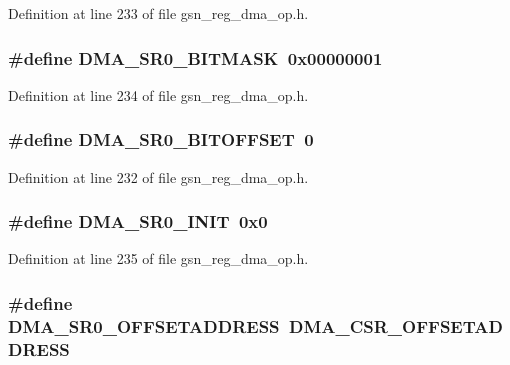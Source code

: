 Definition at line 233 of file gsn\_\-reg\_\-dma\_\-op.h.

\hypertarget{a00547_af658b00712f16d1fa959c76271802034}{
\subsubsection[{DMA\_\-SR0\_\-BITMASK}]{\setlength{\rightskip}{0pt plus 5cm}\#define DMA\_\-SR0\_\-BITMASK~0x00000001}}
\label{a00547_af658b00712f16d1fa959c76271802034}


Definition at line 234 of file gsn\_\-reg\_\-dma\_\-op.h.

\hypertarget{a00547_acf94b64a824bad73e99bc994cc10f5b3}{
\subsubsection[{DMA\_\-SR0\_\-BITOFFSET}]{\setlength{\rightskip}{0pt plus 5cm}\#define DMA\_\-SR0\_\-BITOFFSET~0}}
\label{a00547_acf94b64a824bad73e99bc994cc10f5b3}


Definition at line 232 of file gsn\_\-reg\_\-dma\_\-op.h.

\hypertarget{a00547_a3926fc1ed04ea79e16d3b15b0471fdb3}{
\subsubsection[{DMA\_\-SR0\_\-INIT}]{\setlength{\rightskip}{0pt plus 5cm}\#define DMA\_\-SR0\_\-INIT~0x0}}
\label{a00547_a3926fc1ed04ea79e16d3b15b0471fdb3}


Definition at line 235 of file gsn\_\-reg\_\-dma\_\-op.h.

\hypertarget{a00547_a12acfae055f8d089c0dbe4d97c0b7204}{
\subsubsection[{DMA\_\-SR0\_\-OFFSETADDRESS}]{\setlength{\rightskip}{0pt plus 5cm}\#define DMA\_\-SR0\_\-OFFSETADDRESS~DMA\_\-CSR\_\-OFFSETADDRESS}}
\label{a00547_a12acfae055f8d089c0dbe4d97c0b7204}


